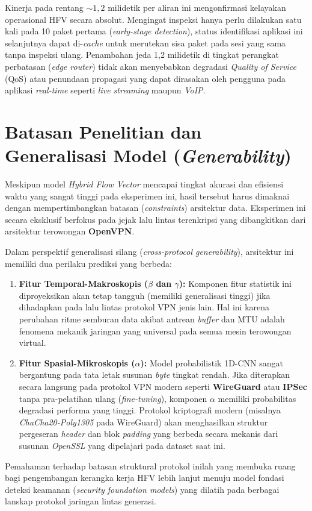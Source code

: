 Kinerja pada rentang $\sim 1,2$ milidetik per aliran ini mengonfirmasi kelayakan operasional HFV secara absolut. Mengingat inspeksi hanya perlu dilakukan satu kali pada 10 paket pertama (\textit{early-stage detection}), status identifikasi aplikasi ini selanjutnya dapat di-\textit{cache} untuk merutekan sisa paket pada sesi yang sama tanpa inspeksi ulang. Penambahan jeda 1,2 milidetik di tingkat perangkat perbatasan (\textit{edge router}) tidak akan menyebabkan degradasi \textit{Quality of Service} (QoS) atau penundaan propagasi yang dapat dirasakan oleh pengguna pada aplikasi \textit{real-time} seperti \textit{live streaming} maupun \textit{VoIP}.

\section{Batasan Penelitian dan Generalisasi Model (\textit{Generability})}
\label{sec:bab4-generalisasi}

Meskipun model \textit{Hybrid Flow Vector} mencapai tingkat akurasi dan efisiensi waktu yang sangat tinggi pada eksperimen ini, hasil tersebut harus dimaknai dengan mempertimbangkan batasan (\textit{constraints}) arsitektur data. Eksperimen ini secara eksklusif berfokus pada jejak lalu lintas terenkripsi yang dibangkitkan dari arsitektur terowongan \textbf{OpenVPN}.

Dalam perspektif generalisasi silang (\textit{cross-protocol generability}), arsitektur ini memiliki dua perilaku prediksi yang berbeda:
\begin{enumerate}
    \item \textbf{Fitur Temporal-Makroskopis ($\beta$ dan $\gamma$):} Komponen fitur statistik ini diproyeksikan akan tetap tangguh (memiliki generalisasi tinggi) jika dihadapkan pada lalu lintas protokol VPN jenis lain. Hal ini karena perubahan ritme semburan data akibat antrean \textit{buffer} dan MTU adalah fenomena mekanik jaringan yang universal pada semua mesin terowongan virtual.
    \item \textbf{Fitur Spasial-Mikroskopis ($\alpha$):} Model probabilistik 1D-CNN sangat bergantung pada tata letak susunan \textit{byte} tingkat rendah. Jika diterapkan secara langsung pada protokol VPN modern seperti \textbf{WireGuard} atau \textbf{IPSec} tanpa pra-pelatihan ulang (\textit{fine-tuning}), komponen $\alpha$ memiliki probabilitas degradasi performa yang tinggi. Protokol kriptografi modern (misalnya \textit{ChaCha20-Poly1305} pada WireGuard) akan menghasilkan struktur pergeseran \textit{header} dan blok \textit{padding} yang berbeda secara mekanis dari susunan \textit{OpenSSL} yang dipelajari pada dataset saat ini.
\end{enumerate}

Pemahaman terhadap batasan struktural protokol inilah yang membuka ruang bagi pengembangan kerangka kerja HFV lebih lanjut menuju model fondasi deteksi keamanan (\textit{security foundation models}) yang dilatih pada berbagai lanskap protokol jaringan lintas generasi.